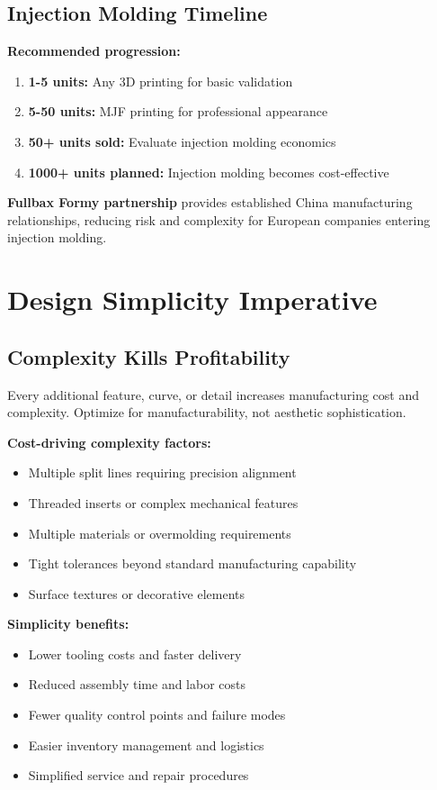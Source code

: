\subsection{Injection Molding Timeline}

\textbf{Recommended progression:}
\begin{enumerate}
\item \textbf{1-5 units:} Any 3D printing for basic validation
\item \textbf{5-50 units:} MJF printing for professional appearance
\item \textbf{50+ units sold:} Evaluate injection molding economics
\item \textbf{1000+ units planned:} Injection molding becomes cost-effective
\end{enumerate}

\textbf{Fullbax Formy partnership} provides established China manufacturing relationships, reducing risk and complexity for European companies entering injection molding.

\section{Design Simplicity Imperative}

\subsection{Complexity Kills Profitability}

Every additional feature, curve, or detail increases manufacturing cost and complexity. Optimize for manufacturability, not aesthetic sophistication.

\textbf{Cost-driving complexity factors:}
\begin{itemize}
\item Multiple split lines requiring precision alignment
\item Threaded inserts or complex mechanical features
\item Multiple materials or overmolding requirements
\item Tight tolerances beyond standard manufacturing capability
\item Surface textures or decorative elements
\end{itemize}

\textbf{Simplicity benefits:}
\begin{itemize}
\item Lower tooling costs and faster delivery
\item Reduced assembly time and labor costs
\item Fewer quality control points and failure modes
\item Easier inventory management and logistics
\item Simplified service and repair procedures
\end{itemize}

